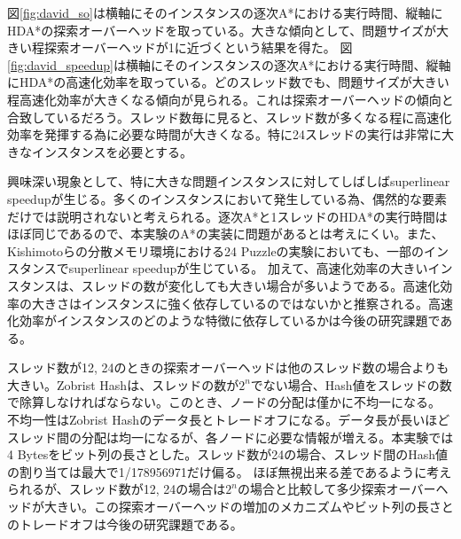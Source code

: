 \documentclass[uplatex]{jsarticle}
\begin{document}

図\ref{fig:david_so}は横軸にそのインスタンスの逐次A*における実行時間、縦軸にHDA*の探索オーバーヘッドを取っている。大きな傾向として、問題サイズが大きい程探索オーバーヘッドが1に近づくという結果を得た。
図\ref{fig:david_speedup}は横軸にそのインスタンスの逐次A*における実行時間、縦軸にHDA*の高速化効率を取っている。どのスレッド数でも、問題サイズが大きい程高速化効率が大きくなる傾向が見られる。これは探索オーバーヘッドの傾向と合致しているだろう。スレッド数毎に見ると、スレッド数が多くなる程に高速化効率を発揮する為に必要な時間が大きくなる。特に24スレッドの実行は非常に大きなインスタンスを必要とする。

興味深い現象として、特に大きな問題インスタンスに対してしばしばsuperlinear speedupが生じる。多くのインスタンスにおいて発生している為、偶然的な要素だけでは説明されないと考えられる。逐次A*と1スレッドのHDA*の実行時間はほぼ同じであるので、本実験のA*の実装に問題があるとは考えにくい。また、Kishimotoらの分散メモリ環境における24 Puzzleの実験においても、一部のインスタンスでsuperlinear speedupが生じている\cite{Kishimoto2013}。
加えて、高速化効率の大きいインスタンスは、スレッドの数が変化しても大きい場合が多いようである。高速化効率の大きさはインスタンスに強く依存しているのではないかと推察される。高速化効率がインスタンスのどのような特徴に依存しているかは今後の研究課題である。

スレッド数が12, 24のときの探索オーバーヘッドは他のスレッド数の場合よりも大きい。Zobrist Hashは、スレッドの数が$2^n$でない場合、Hash値をスレッドの数で除算しなければならない。このとき、ノードの分配は僅かに不均一になる。%
不均一性はZobrist Hashのデータ長とトレードオフになる。データ長が長いほどスレッド間の分配は均一になるが、各ノードに必要な情報が増える。本実験では4 Bytesをビット列の長さとした。スレッド数が24の場合、スレッド間のHash値の割り当ては最大で1/178956971だけ偏る。%
ほぼ無視出来る差であるように考えられるが、スレッド数が12, 24の場合は$2^n$の場合と比較して多少探索オーバーヘッドが大きい。この探索オーバーヘッドの増加のメカニズムやビット列の長さとのトレードオフは今後の研究課題である。
\newline
\end{document}
